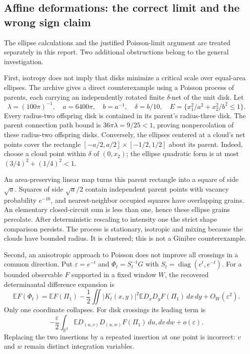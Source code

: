 \documentclass[11pt,a4paper]{article}
\theoremstyle{definition}
\theoremstyle{remark}
\numberwithin{equation}{section}
\begin{document}
\subsection{Affine deformations: the correct limit and the wrong sign claim}
\label{br:affine}

The ellipse calculations and the justified Poisson-limit argument are
treated separately in this report.  Two additional obstructions belong
to the general investigation.

First, isotropy does not imply that disks minimize a critical scale over
equal-area ellipses.  The archive gives a direct counterexample using a
Poisson process of parents, each carrying an independently rotated finite
$\delta$-net of the unit disk.  Let
\[
 \lambda=(100\pi)^{-1},\quad a=6400\pi,
 \quad b=a^{-1},\quad\delta=b/10,
 \quad E=\{x_1^2/a^2+x_2^2/b^2\leq1\}.
\]
Every radius-two offspring disk is contained in its parent's radius-three
disk.  The parent connection path bound is
$36\pi\lambda=9/25<1$, proving nonpercolation of these radius-two
offspring disks.  Conversely, the ellipses centered at a cloud's net
points cover the rectangle
$[-a/2,a/2]\times[-1/2,1/2]$ about its parent.  Indeed, choose a cloud
point within $\delta$ of $(0,x_2)$; the ellipse quadratic form is at most
$(3/4)^2+(1/4)^2<1$.

An area-preserving linear map turns this parent rectangle into a square
of side $\sqrt a$.  Squares of side $\sqrt a/2$ contain independent parent
points with vacancy probability $e^{-16}$, and nearest-neighbor occupied
squares have overlapping grains.  An elementary closed-circuit sum is
less than one, hence these ellipse grains percolate.  After deterministic
rescaling to intensity one the strict shape comparison persists.  The
process is stationary, isotropic and mixing because the clouds have
bounded radius.  It is clustered; this is not a Ginibre counterexample.

Second, an anisotropic approach to Poisson does not improve all crossings
in a common direction.  Put $\varepsilon=e^{-t}$ and
$\Phi_t=S_t^{-1}G$ with $S_t=\operatorname{diag}(e^t,e^{-t})$.
For a bounded observable $F$ supported in a fixed window $W$, the
recovered determinantal difference expansion is
\begin{equation}
 \mathbb EF(\Phi_t)=\mathbb EF(\Pi_1)
 -\frac12\iint |K_t(x,y)|^2\mathbb ED_xD_yF(\Pi_1)\,dx\,dy
 +O_W(\varepsilon^2).
 \label{br:anisotropic-expansion}
\end{equation}
Only one coordinate collapses.  For disk crossings its leading term is
\[
 -\frac{\varepsilon}{2}
 \int_{\mathbb R^3}
 \mathbb ED_{(u,v)}D_{(u,w)}F(\Pi_1)\,du,dv\,dw+o(\varepsilon).
\]
Replacing the two insertions by a repeated insertion at one point is
incorrect: $v$ and $w$ remain distinct integration variables.
\end{document}
